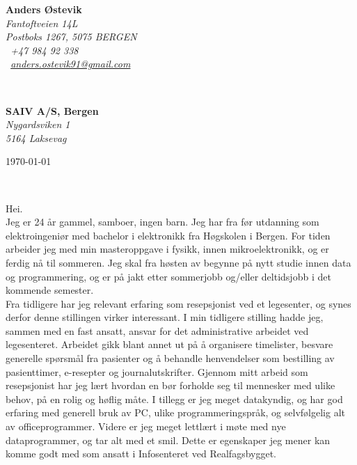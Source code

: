 \documentclass[11pt, norsk]{article}
\begin{document}
\sffamily   %
\hfill%
\begin{minipage}[t]{.6\textwidth}
\raggedleft%
{\bfseries Anders Østevik}\\[.35ex]
\small\itshape%
Fantoftveien 14L\\
Postboks 1267, 5075 BERGEN\\[.35ex]
\Telefon~+47 984 92 338\\
\Letter~\href{mailto:anders.ostevik91@gmail.com}{anders.ostevik91@gmail.com}
\end{minipage}\\[1em]
%
\begin{minipage}[t]{.4\textwidth}
\raggedright%
{\bfseries SAIV A/S, Bergen}\\[.35ex]
\small\itshape%
Nygardsviken 1\\
5164 Laksevag
\end{minipage}
\hfill %
\begin{minipage}[t]{.4\textwidth}
\raggedleft %
\today
\end{minipage}\\[2em]
\raggedright

Hei.\\[1.5em]
Jeg er 24 år gammel, samboer, ingen barn. Jeg har fra før utdanning som elektroingeniør med bachelor i elektronikk fra Høgskolen i Bergen. For tiden arbeider jeg med min masteroppgave i fysikk, innen mikroelektronikk, og er ferdig nå til sommeren. Jeg skal fra høsten av begynne på nytt studie innen data og programmering, og er på jakt etter sommerjobb og/eller deltidsjobb i det kommende semester.\\[1.0em]

Fra tidligere har jeg relevant erfaring som resepsjonist ved et legesenter, og synes derfor denne stillingen virker interessant. I min tidligere stilling hadde jeg, sammen med en fast ansatt, ansvar for det administrative arbeidet ved legesenteret. Arbeidet gikk blant annet ut på å organisere timelister, besvare generelle spørsmål fra pasienter og å behandle henvendelser som bestilling av pasienttimer, e-resepter og journalutskrifter. Gjennom mitt arbeid som resepsjonist har jeg lært hvordan en bør forholde seg til mennesker med ulike behov, på en rolig og høflig måte. I tillegg er jeg meget datakyndig, og har god erfaring med generell bruk av PC, ulike programmeringspråk, og selvfølgelig alt av officeprogrammer. Videre er jeg meget lettlært i møte med nye dataprogrammer, og tar alt med et smil. Dette er egenskaper jeg mener kan komme godt med som ansatt i Infosenteret ved Realfagsbygget. \\[1.5em]
\end{document}
